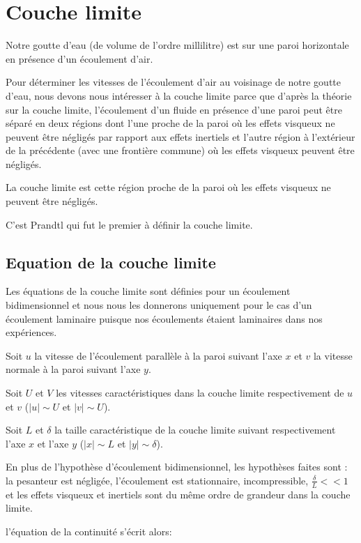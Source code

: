 \documentclass[french]{article}
\begin{document}
 
\section{Couche limite}
Notre goutte d'eau (de volume de l'ordre millilitre) est sur une paroi horizontale en présence d'un écoulement d'air.


Pour déterminer les vitesses de l'écoulement d'air au voisinage de notre goutte d'eau, nous devons nous intéresser à la couche limite parce que d'après la théorie sur la couche limite, l'écoulement d'un fluide en présence d'une paroi peut être séparé en deux régions dont l'une proche de la paroi où les effets visqueux ne peuvent être négligés par rapport aux effets inertiels et l'autre région à l'extérieur de la précédente (avec une frontière commune) où les effets visqueux peuvent être négligés.

La couche limite est cette région proche de la paroi où les effets visqueux ne peuvent être négligés.

C'est Prandtl qui fut le premier à définir la couche limite. 

\subsection{Equation de la couche limite }

Les équations de la couche limite sont définies pour un écoulement bidimensionnel et nous nous les donnerons uniquement pour le cas d'un écoulement laminaire puisque nos écoulements étaient laminaires dans nos expériences.

Soit $u$ la vitesse de l'écoulement parallèle à la paroi suivant l'axe $x$ et $v$ la vitesse normale à la paroi suivant l'axe $y$.

Soit $U$ et $V$ les vitesses caractéristiques dans la couche limite respectivement de $u$ et $v$ ($\left| u \right| \sim U$ et $\left| v \right| \sim U$).

Soit $L$ et $\delta$ la taille caractéristique de la couche limite suivant respectivement l'axe $x$ et l'axe $y$ ($\left| x \right| \sim L$ et $\left| y \right| \sim \delta$).

En plus de l'hypothèse d'écoulement bidimensionnel, les hypothèses faites sont : la pesanteur est négligée, l'écoulement est stationnaire, incompressible, $\frac{\delta}{L} << 1$ et les effets visqueux et inertiels sont du même ordre de grandeur dans la couche limite.



l'équation de la continuité s'écrit alors:
\end{document}
